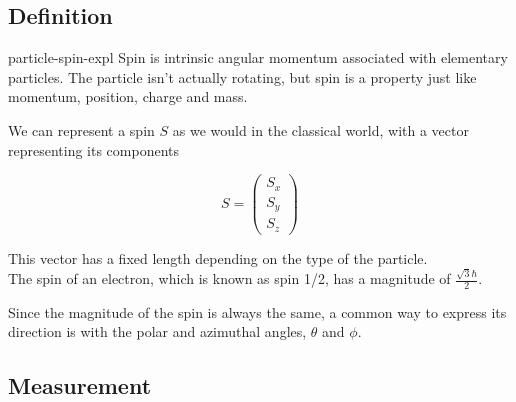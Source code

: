 \documentclass[preview]{standalone}
\begin{document}
\genpage

\subsection{Definition}

\begin{snippet}{particle-spin-expl}
    Spin is intrinsic angular momentum associated with elementary particles.
    The particle isn't actually rotating, but spin is a property just like momentum, position, charge and mass.

    We can represent a spin \(S\) as we would in the classical world, with a vector representing its components

    \[
        S=
        \begin{pmatrix}
            S_x \\
            S_y \\
            S_z
        \end{pmatrix}
    \]

    This vector has a fixed length depending on the type of the particle. \\
    The spin of an electron, which is known as spin 1/2, has a magnitude of \(\frac{\sqrt{3}\hbar}{2}\).

    Since the magnitude of the spin is always the same, a common way to express its direction is with the polar and azimuthal angles, \(\theta\) and \(\phi\).
\end{snippet}

\subsection{Measurement}
\end{document}

